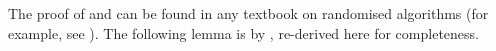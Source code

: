 \documentclass[11pt]{article}
\begin{document}





The proof of  and 
can be found in any textbook on randomised algorithms (for example, see \citep[Chapter 1, Chapter 7]{mitzenmacher2017probability}). 
The following lemma is by \citep[Lemma 4.3]{Austrin_2022}, re-derived here for completeness.
\end{document}
